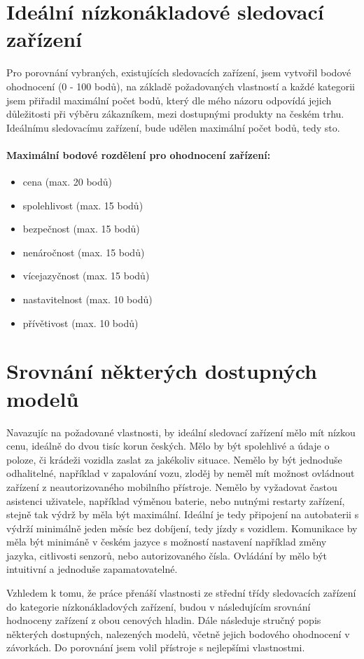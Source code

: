 \documentclass[FM,BP]{tulthesis}  %
\begin{document}
\section{Ideální nízkonákladové sledovací zařízení}
Pro porovnání vybraných, existujících sledovacích zařízení, jsem vytvořil bodové ohodnocení (0 - 100 bodů), na základě požadovaných vlastností a každé kategorii jsem přiřadil maximální počet bodů, který dle mého názoru odpovídá jejich důležitosti při výběru zákazníkem, mezi dostupnými produkty na českém trhu. Ideálnímu sledovacímu zařízení, bude udělen maximální počet bodů, tedy sto.

\paragraph{Maximální bodové rozdělení pro ohodnocení zařízení:}
\begin{itemize}
\item cena (max. 20 bodů)
\item spolehlivost (max. 15 bodů)
\item bezpečnost (max. 15 bodů)
\item nenáročnost (max. 15 bodů)
\item vícejazyčnost (max. 15 bodů)
\item nastavitelnost (max. 10 bodů)
\item přívětivost (max. 10 bodů)
\end{itemize}

\section{Srovnání některých dostupných modelů}
Navazujíc na požadované vlastnosti, by ideální sledovací zařízení mělo mít nízkou cenu, ideálně do dvou tisíc korun českých. Mělo by být spolehlivé a údaje o poloze, či krádeži vozidla zaslat za jakékoliv situace. Nemělo by být jednoduše odhalitelné, například v zapalování vozu, zloděj by neměl mít možnost ovládnout zařízení z neautorizovaného mobilního přístroje. Nemělo by vyžadovat častou asistenci uživatele, například výměnou baterie, nebo nutnými restarty zařízení, stejně tak výdrž by měla být maximální. Ideální je tedy připojení na autobaterii s výdrží minimálně jeden měsíc bez dobíjení, tedy jízdy s vozidlem. Komunikace by měla být minimáně v českém jazyce s možností nastavení například změny jazyka, citlivosti senzorů, nebo autorizovaného čísla. Ovládání by mělo být intuitivní a jednoduše zapamatovatelné.

Vzhledem k tomu, že práce přenáší vlastnosti ze střední třídy sledovacích zařízení do kategorie nízkonákladových zařízení, budou v následujícím srovnání hodnoceny zařízení z obou cenových hladin. Dále následuje stručný popis některých dostupných, nalezených modelů, včetně jejich bodového ohodnocení v závorkách. Do porovnání jsem volil přístroje s nejlepšími vlastnostmi.
\end{document}
